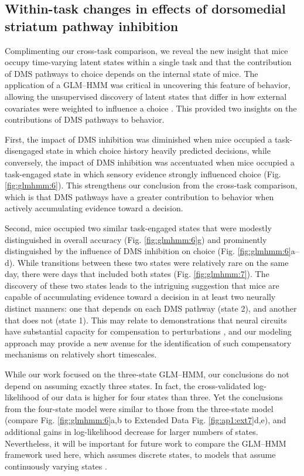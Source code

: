 \subsection{Within-task changes in effects of dorsomedial striatum pathway inhibition}
\label{sec:glmhmm:discussion-2}

Complimenting our cross-task comparison, we reveal the new insight that mice occupy time-varying latent states within a single task and that the contribution of DMS pathways to choice depends on the internal state of mice. The application of a GLM–HMM was critical in uncovering this feature of behavior, allowing the unsupervised discovery of latent states that differ in how external covariates were weighted to influence a choice \cite{calhoun_unsupervised_2019, eldar_effects_2011, ahilan_forgetful_2018}. This provided two insights on the contributions of DMS pathways to behavior.

First, the impact of DMS inhibition was diminished when mice occupied a task-disengaged state in which choice history heavily predicted decisions, while conversely, the impact of DMS inhibition was accentuated when mice occupied a task-engaged state in which sensory evidence strongly influenced choice (Fig. \ref{fig:glmhmm:6}). This strengthens our conclusion from the cross-task comparison, which is that DMS pathways have a greater contribution to behavior when actively accumulating evidence toward a decision.

Second, mice occupied two similar task-engaged states that were modestly distinguished in overall accuracy (Fig. \ref{fig:glmhmm:6}g) and prominently distinguished by the influence of DMS inhibition on choice (Fig. \ref{fig:glmhmm:6}a–d). While transitions between these two states were relatively rare on the same day, there were days that included both states (Fig. \ref{fig:glmhmm:7}). The discovery of these two states leads to the intriguing suggestion that mice are capable of accumulating evidence toward a decision in at least two neurally distinct manners: one that depends on each DMS pathway (state 2), and another that does not (state 1). This may relate to demonstrations that neural circuits have substantial capacity for compensation to perturbations \cite{goshen_dynamics_2011, fetsch_focal_2018}, and our modeling approach may provide a new avenue for the identification of such compensatory mechanisms on relatively short timescales.

While our work focused on the three-state GLM–HMM, our conclusions do not depend on assuming exactly three states. In fact, the cross-validated log-likelihood of our data is higher for four states than three. Yet the conclusions from the four-state model were similar to those from the three-state model (compare Fig. \ref{fig:glmhmm:6}a,b to Extended Data Fig. \ref{fig:ap1:ext7}d,e), and additional gains in log-likelihood decrease for larger numbers of states. Nevertheless, it will be important for future work to compare the GLM–HMM framework used here, which assumes discrete states, to models that assume continuously varying states \cite{ashwood_mice_2022, roy_extracting_2021}.

